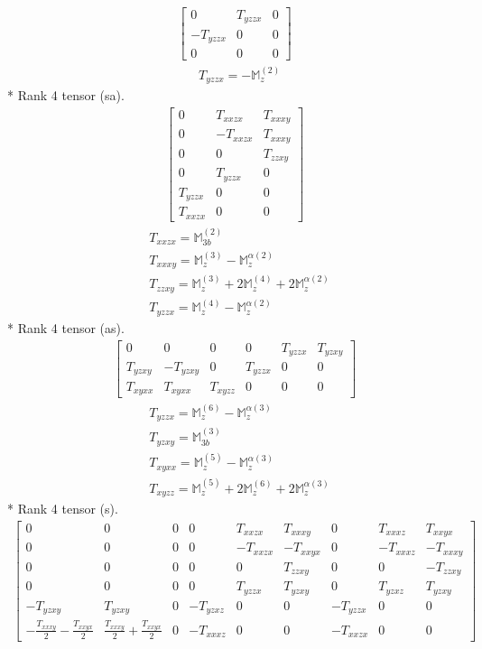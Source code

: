 \documentclass[fleqn,8pt,landscape]{jsarticle}
\begin{document}
\begin{align*}
\begin{bmatrix} 0 & T_{yzzx} & 0 \\ - T_{yzzx} & 0 & 0 \\ 0 & 0 & 0 \end{bmatrix}
\end{align*}
\begin{align*}
& T_{yzzx} = - \mathbb{M}_{z}^{(2)}
\end{align*}
* Rank 4 tensor (sa).
\begin{align*}
\begin{bmatrix} 0 & T_{xxzx} & T_{xxxy} \\ 0 & - T_{xxzx} & T_{xxxy} \\ 0 & 0 & T_{zzxy} \\ 0 & T_{yzzx} & 0 \\ T_{yzzx} & 0 & 0 \\ T_{xxzx} & 0 & 0 \end{bmatrix}
\end{align*}
\begin{align*}
& T_{xxzx} = \mathbb{M}_{3b}^{(2)} \\
& T_{xxxy} = \mathbb{M}_{z}^{(3)} - \mathbb{M}_{z}^{\alpha(2)} \\
& T_{zzxy} = \mathbb{M}_{z}^{(3)} + 2 \mathbb{M}_{z}^{(4)} + 2 \mathbb{M}_{z}^{\alpha(2)} \\
& T_{yzzx} = \mathbb{M}_{z}^{(4)} - \mathbb{M}_{z}^{\alpha(2)}
\end{align*}
* Rank 4 tensor (as).
\begin{align*}
\begin{bmatrix} 0 & 0 & 0 & 0 & T_{yzzx} & T_{yzxy} \\ T_{yzxy} & - T_{yzxy} & 0 & T_{yzzx} & 0 & 0 \\ T_{xyxx} & T_{xyxx} & T_{xyzz} & 0 & 0 & 0 \end{bmatrix}
\end{align*}
\begin{align*}
& T_{yzzx} = \mathbb{M}_{z}^{(6)} - \mathbb{M}_{z}^{\alpha(3)} \\
& T_{yzxy} = \mathbb{M}_{3b}^{(3)} \\
& T_{xyxx} = \mathbb{M}_{z}^{(5)} - \mathbb{M}_{z}^{\alpha(3)} \\
& T_{xyzz} = \mathbb{M}_{z}^{(5)} + 2 \mathbb{M}_{z}^{(6)} + 2 \mathbb{M}_{z}^{\alpha(3)}
\end{align*}
* Rank 4 tensor (s).
\begin{align*}
\begin{bmatrix} 0 & 0 & 0 & 0 & T_{xxzx} & T_{xxxy} & 0 & T_{xxxz} & T_{xxyx} \\ 0 & 0 & 0 & 0 & - T_{xxzx} & - T_{xxyx} & 0 & - T_{xxxz} & - T_{xxxy} \\ 0 & 0 & 0 & 0 & 0 & T_{zzxy} & 0 & 0 & - T_{zzxy} \\ 0 & 0 & 0 & 0 & T_{yzzx} & T_{yzxy} & 0 & T_{yzxz} & T_{yzxy} \\ - T_{yzxy} & T_{yzxy} & 0 & - T_{yzxz} & 0 & 0 & - T_{yzzx} & 0 & 0 \\ - \frac{T_{xxxy}}{2} - \frac{T_{xxyx}}{2} & \frac{T_{xxxy}}{2} + \frac{T_{xxyx}}{2} & 0 & - T_{xxxz} & 0 & 0 & - T_{xxzx} & 0 & 0 \end{bmatrix}
\end{align*}
\end{document}
